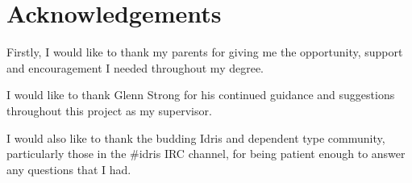 \chapter*{Acknowledgements}
Firstly, I would like to thank my parents for giving me the opportunity, support
and encouragement I needed throughout my degree.

\noindent
I would like to thank Glenn Strong for his continued guidance and suggestions
throughout this project as my supervisor.

\noindent
I would also like to thank the budding Idris and dependent type community,
particularly those in the \#idris IRC channel, for being patient enough to
answer any questions that I had.
